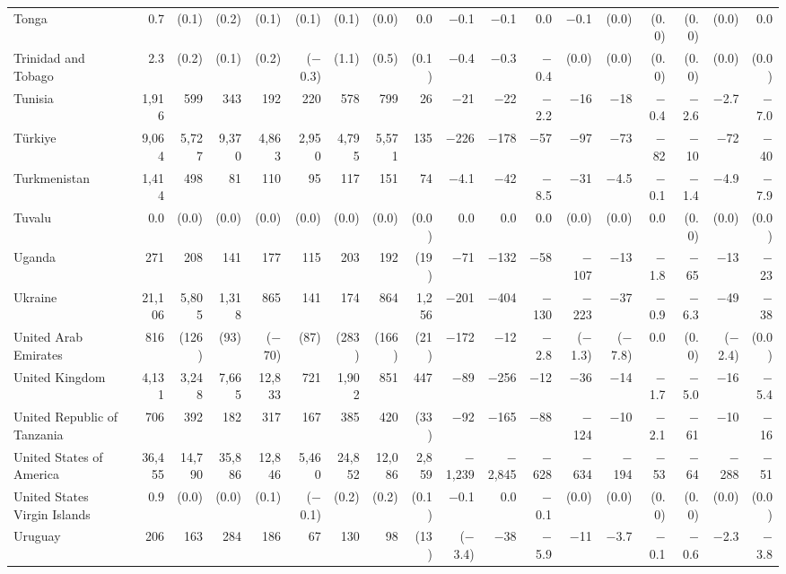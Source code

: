\begin{longtable}{lrrrrrrrrrrrrrrrrr}
Tonga & 0.7 & (0.1) & (0.2) & (0.1) & (0.1) & (0.1) & (0.0) & 0.0 & $-$0.1 & $-$0.1 & 0.0 & $-$0.1 & (0.0) & (0.0) & (0.0) & (0.0) & 0.0 \\
Trinidad and Tobago & 2.3 & (0.2) & (0.1) & (0.2) & ($-$0.3) & (1.1) & (0.5) & (0.1) & $-$0.4 & $-$0.3 & $-$0.4 & (0.0) & (0.0) & (0.0) & (0.0) & (0.0) & (0.0) \\
Tunisia & 1,916 & 599 & 343 & 192 & 220 & 578 & 799 & 26 & $-$21 & $-$22 & $-$2.2 & $-$16 & $-$18 & $-$0.4 & $-$2.6 & $-$2.7 & $-$7.0 \\
Türkiye & 9,064 & 5,727 & 9,370 & 4,863 & 2,950 & 4,795 & 5,571 & 135 & $-$226 & $-$178 & $-$57 & $-$97 & $-$73 & $-$82 & $-$10 & $-$72 & $-$40 \\
Turkmenistan & 1,414 & 498 & 81 & 110 & 95 & 117 & 151 & 74 & $-$4.1 & $-$42 & $-$8.5 & $-$31 & $-$4.5 & $-$0.1 & $-$1.4 & $-$4.9 & $-$7.9 \\
Tuvalu & 0.0 & (0.0) & (0.0) & (0.0) & (0.0) & (0.0) & (0.0) & (0.0) & 0.0 & 0.0 & 0.0 & (0.0) & (0.0) & 0.0 & (0.0) & (0.0) & (0.0) \\
Uganda & 271 & 208 & 141 & 177 & 115 & 203 & 192 & (19) & $-$71 & $-$132 & $-$58 & $-$107 & $-$13 & $-$1.8 & $-$65 & $-$13 & $-$23 \\
Ukraine & 21,106 & 5,805 & 1,318 & 865 & 141 & 174 & 864 & 1,256 & $-$201 & $-$404 & $-$130 & $-$223 & $-$37 & $-$0.9 & $-$6.3 & $-$49 & $-$38 \\
United Arab Emirates & 816 & (126) & (93) & ($-$70) & (87) & (283) & (166) & (21) & $-$172 & $-$12 & $-$2.8 & ($-$1.3) & ($-$7.8) & 0.0 & (0.0) & ($-$2.4) & (0.0) \\
United Kingdom & 4,131 & 3,248 & 7,665 & 12,833 & 721 & 1,902 & 851 & 447 & $-$89 & $-$256 & $-$12 & $-$36 & $-$14 & $-$1.7 & $-$5.0 & $-$16 & $-$5.4 \\
United Republic of Tanzania & 706 & 392 & 182 & 317 & 167 & 385 & 420 & (33) & $-$92 & $-$165 & $-$88 & $-$124 & $-$10 & $-$2.1 & $-$61 & $-$10 & $-$16 \\
United States of America & 36,455 & 14,790 & 35,886 & 12,846 & 5,460 & 24,852 & 12,086 & 2,859 & $-$1,239 & $-$2,845 & $-$628 & $-$634 & $-$194 & $-$53 & $-$64 & $-$288 & $-$51 \\
United States Virgin Islands & 0.9 & (0.0) & (0.0) & (0.1) & ($-$0.1) & (0.2) & (0.2) & (0.1) & $-$0.1 & 0.0 & $-$0.1 & (0.0) & (0.0) & (0.0) & (0.0) & (0.0) & (0.0) \\
Uruguay & 206 & 163 & 284 & 186 & 67 & 130 & 98 & (13) & ($-$3.4) & $-$38 & $-$5.9 & $-$11 & $-$3.7 & $-$0.1 & $-$0.6 & $-$2.3 & $-$3.8 \\

\end{longtable}
